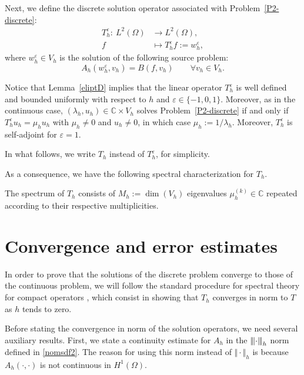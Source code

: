 \documentclass[onefignum,onetabnum,final]{siamart250211}
\numberwithin{equation}{section}
\newcommand\0{\boldsymbol{0}}
\renewcommand\dim{\mathop{\mathrm{dim}}\nolimits}
\def\l{\lambda}
\newcommand{\vertiii}[1]{{\left\vert\kern-0.25ex\left\vert\kern-0.25ex\left\vert #1 
		\right\vert\kern-0.25ex\right\vert\kern-0.25ex\right\vert}}
\begin{document}
	Next, we define the discrete solution operator associated with Problem~\ref{P2-discrete}:
	\begin{align*}
		T_h^\varepsilon:\ L^2(\Omega) & \longrightarrow L^2(\Omega),
		\\
		f & \longmapsto T_h^\varepsilon f:=w_h^\varepsilon,
	\end{align*}
	where $w_h^\varepsilon\in V_h$ is the solution of the following source problem:
	\begin{equation*}
		\label{T1D}
		A_h(w_h^\varepsilon,v_h)=B(f,v_h)
		\qquad\forall v_h\in V_h.
	\end{equation*}
	
	
	Notice that Lemma~\ref{eliptD} implies that the linear operator $T_h^\varepsilon$ is well
	defined and bounded uniformly with respect to $h$ and $\varepsilon\in\{-1,0,1\}$. Moreover, as in the
	continuous case, $(\l_h,u_h)\in\mathbb{C}\times V_h$ solves Problem~\ref{P2-discrete}
	if and only if $T_h^\varepsilon u_h=\mu_h u_h$ with
	$\mu_h\neq0$ and $u_h\ne0$, in which case $\mu_h:= 1/\l_h$.
	Moreover, $T_h^\varepsilon$ is self-adjoint for $\varepsilon=1$.
	
	In what follows, we write $T_h$ instead of $T_h^\varepsilon$, for simplicity.
	
	As a consequence, we have the following spectral characterization for $T_h$.
	
	\begin{theorem}
		\label{CHAR_SP_DISC}
		The spectrum of $T_h$ consists of $M_h:=\dim(V_h)$ eigenvalues
		$\mu_{h}^{(k)}\in\mathbb{C}$ repeated according to their respective multiplicities.
	\end{theorem}
	
	
	
	\setcounter{equation}{0}
	\section{Convergence and error estimates}
	\label{SEC:approximation}
	
	
	In order to prove that the solutions of the discrete
	problem converge to those of the continuous
	problem, we will follow the standard procedure
	for spectral theory for compact operators \cite{BO},
	which consist in showing that $T_h$
	converges in norm to $T$ as $h$ tends to zero.
	
	Before stating the convergence in norm of the solution operators, we need several auxiliary results. First, we state a continuity estimate for $A_h$ in the $\vertiii{\cdot}_h$ norm defined in \eqref{nomsdf2}. The reason for using this norm instead of $\Vert \cdot\Vert_h$ is because $A_h(\cdot,\cdot)$ is not continuous in $H^1(\Omega)$. 
	
\end{document}
